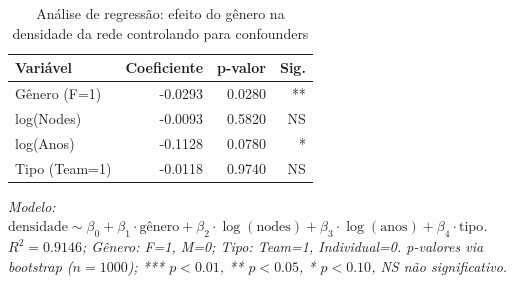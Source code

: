 \begin{table}[H]
\centering
\caption{Análise de regressão: efeito do gênero na densidade da rede controlando para confounders}
\label{tab:confounder_regression}
\begin{tabular}{lrrr}
\hline
\textbf{Variável} & \textbf{Coeficiente} & \textbf{p-valor} & \textbf{Sig.} \\
\hline
Gênero (F=1) & -0.0293 & 0.0280 & ** \\
log(Nodes) & -0.0093 & 0.5820 & NS \\
log(Anos) & -0.1128 & 0.0780 & * \\
Tipo (Team=1) & -0.0118 & 0.9740 & NS \\
\hline
\end{tabular}

\vspace{0.3cm}

\footnotesize
\textit{Modelo: $\text{densidade} \sim \beta_0 + \beta_1 \cdot \text{gênero} + \beta_2 \cdot \log(\text{nodes}) + \beta_3 \cdot \log(\text{anos}) + \beta_4 \cdot \text{tipo}$.
$R^2 = 0.9146$; Gênero: F=1, M=0; Tipo: Team=1, Individual=0.
p-valores via bootstrap ($n=1000$); *** $p<0.01$, ** $p<0.05$, * $p<0.10$, NS não significativo.}
\end{table}
